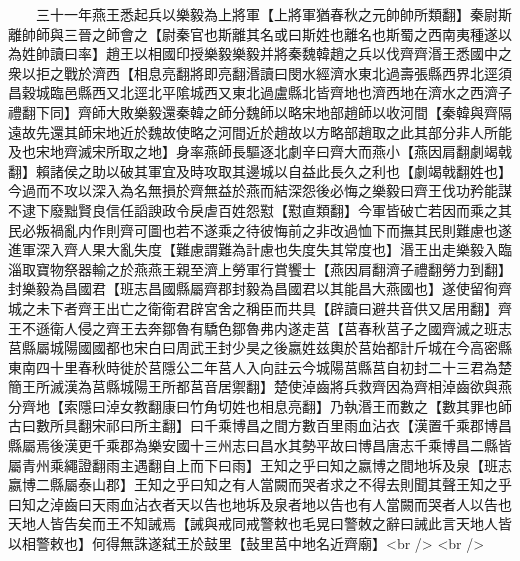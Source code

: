 　　三十一年燕王悉起兵以樂毅為上將軍【上將軍猶春秋之元帥帥所類翻】秦尉斯離帥師與三晉之師會之【尉秦官也斯離其名或曰斯姓也離名也斯蜀之西南夷種遂以為姓帥讀曰率】趙王以相國印授樂毅樂毅并將秦魏韓趙之兵以伐齊齊湣王悉國中之衆以拒之戰於濟西【相息亮翻將即亮翻湣讀曰閔水經濟水東北過壽張縣西界北逕須昌穀城臨邑縣西又北逕北平隂城西又東北過盧縣北皆齊地也濟西地在濟水之西濟子禮翻下同】齊師大敗樂毅還秦韓之師分魏師以略宋地部趙師以收河間【秦韓與齊隔遠故先還其師宋地近於魏故使略之河間近於趙故以方略部趙取之此其部分非人所能及也宋地齊滅宋所取之地】身率燕師長驅逐北劇辛曰齊大而燕小【燕因肩翻劇竭戟翻】賴諸侯之助以破其軍宜及時攻取其邊城以自益此長久之利也【劇竭戟翻姓也】今過而不攻以深入為名無損於齊無益於燕而結深怨後必悔之樂毅曰齊王伐功矜能謀不逮下廢黜賢良信任謟諛政令戾虐百姓怨懟【懟直類翻】今軍皆破亡若因而乘之其民必叛禍亂内作則齊可圖也若不遂乘之待彼悔前之非改過恤下而撫其民則難慮也遂進軍深入齊人果大亂失度【難慮謂難為計慮也失度失其常度也】湣王出走樂毅入臨淄取寶物祭器輸之於燕燕王親至濟上勞軍行賞饗士【燕因肩翻濟子禮翻勞力到翻】封樂毅為昌國君【班志昌國縣屬齊郡封毅為昌國君以其能昌大燕國也】遂使留徇齊城之未下者齊王出亡之衛衛君辟宮舍之稱臣而共具【辟讀曰避共音供又居用翻】齊王不遜衛人侵之齊王去奔鄒魯有驕色鄒魯弗内遂走莒【莒春秋莒子之國齊滅之班志莒縣屬城陽國國都也宋白曰周武王封少昊之後嬴姓兹輿於莒始都計斤城在今高密縣東南四十里春秋時徙於莒隱公二年莒人入向註云今城陽莒縣莒自初封二十三君為楚簡王所滅漢為莒縣城陽王所都莒音居禦翻】楚使淖齒將兵救齊因為齊相淖齒欲與燕分齊地【索隱曰淖女教翻康曰竹角切姓也相息亮翻】乃執湣王而數之【數其罪也師古曰數所具翻宋祁曰所主翻】曰千乘博昌之間方數百里雨血沾衣【漢置千乘郡博昌縣屬焉後漢更千乘郡為樂安國十三州志曰昌水其勢平故曰博昌唐志千乘博昌二縣皆屬青州乘繩證翻雨主遇翻自上而下曰雨】王知之乎曰知之嬴博之間地坼及泉【班志嬴博二縣屬泰山郡】王知之乎曰知之有人當闕而哭者求之不得去則聞其聲王知之乎曰知之淖齒曰天雨血沾衣者天以告也地坼及泉者地以告也有人當闕而哭者人以告也天地人皆告矣而王不知誡焉【誡與戒同戒警敕也毛晃曰警敇之辭曰誡此言天地人皆以相警敕也】何得無誅遂弑王於鼓里【鼔里莒中地名近齊廟】<br />
<br />
